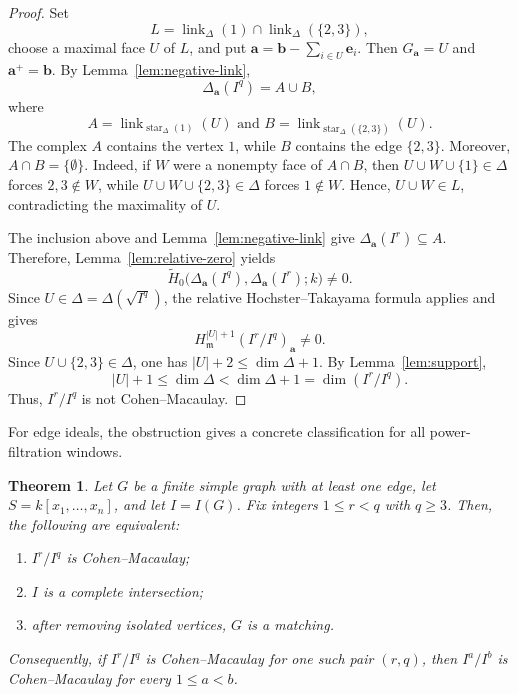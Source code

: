 \documentclass[12pt]{amsart}
\theoremstyle{plain}
\newtheorem{theorem}{Theorem}[section]
\theoremstyle{definition}
\theoremstyle{remark}
\begin{document}
\begin{proof}
Set
$$
L=\operatorname{link}_\Delta(1)
\cap
\operatorname{link}_\Delta(\{2,3\}),
$$
choose a maximal face $U$ of $L$, and put
$\mathbf a=\mathbf b-\sum_{i\in U}\mathbf e_i$. Then
$G_{\mathbf a}=U$ and $\mathbf a^+=\mathbf b$. By
Lemma~\ref{lem:negative-link},
$$
\Delta_{\mathbf a}(I^q)=A\cup B,
$$
where
$$
A=\operatorname{link}_{\operatorname{star}_\Delta(1)}(U)
\text{ and }
B=\operatorname{link}_{\operatorname{star}_\Delta(\{2,3\})}(U).
$$
The complex $A$ contains the vertex $1$, while $B$ contains the edge
$\{2,3\}$. Moreover, $A\cap B=\{\emptyset\}$. Indeed, if $W$ were a
nonempty face of $A\cap B$, then
$U\cup W\cup\{1\}\in\Delta$ forces $2,3\notin W$, while
$U\cup W\cup\{2,3\}\in\Delta$ forces $1\notin W$. Hence,
$U\cup W\in L$, contradicting the maximality of $U$.

The inclusion above and Lemma~\ref{lem:negative-link} give
$\Delta_{\mathbf a}(I^r)\subseteq A$. Therefore,
Lemma~\ref{lem:relative-zero} yields
$$
\widetilde H_0
\bigl(\Delta_{\mathbf a}(I^q),\Delta_{\mathbf a}(I^r);k\bigr)
\neq0.
$$
Since $U\in\Delta=\Delta(\sqrt{I^q})$, the relative
Hochster--Takayama formula applies and gives
$$
H_{\mathfrak m}^{|U|+1}(I^r/I^q)_{\mathbf a}\neq0.
$$
Since $U\cup\{2,3\}\in\Delta$, one has
$|U|+2\le\dim\Delta+1$. By Lemma~\ref{lem:support},
$$
|U|+1\le\dim\Delta<\dim\Delta+1=\dim(I^r/I^q).
$$
Thus, $I^r/I^q$ is not Cohen--Macaulay.
\end{proof}

For edge ideals, the obstruction gives a concrete classification for all
power-filtration windows.

\begin{theorem}\label{CM-edge-ideals}
Let $G$ be a finite simple graph with at least one edge, let
$S=k[x_1,\ldots,x_n]$, and let $I=I(G)$. Fix integers $1\le r<q$ with
$q\ge3$. Then, the following are equivalent:
\begin{enumerate}
\item $I^r/I^q$ is Cohen--Macaulay;
\item $I$ is a complete intersection;
\item after removing isolated vertices, $G$ is a matching.
\end{enumerate}
Consequently, if $I^r/I^q$ is Cohen--Macaulay for one such pair $(r,q)$,
then $I^a/I^b$ is Cohen--Macaulay for every $1\le a<b$.
\end{theorem}
\end{document}
